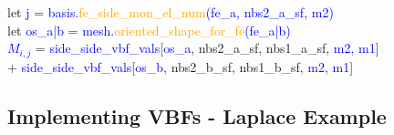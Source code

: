 \documentclass[compress]{beamer}
\begin{document}
\begin{frame}
{    \hspace{0.3cm}let \textcolor{blue}{j} = 
      \textcolor{blue}{basis.\textcolor{orange}{fe\_side\_mon\_el\_num}(\textcolor{green!50!black}{\small fe\_a, nbs2\_a\_sf}, {\small m2})}\\
    \hspace{0.3cm}let \textcolor{blue}{os\_a|b} = 
      \textcolor{blue}{mesh.\textcolor{orange}{oriented\_shape\_for\_fe}(\textcolor{green!50!black}{fe\_a|b})}\\
    \hspace{0.3cm}\textcolor{blue}{$M_{i,j}$} = 
      {\small \textcolor{blue}{side\_side\_vbf\_vals}[\textcolor{blue}{os\_a}, \textcolor{green!50!black}{nbs2\_a\_sf, nbs1\_a\_sf},
      \textcolor{blue}{m2, m1}]}\\
    \hspace{1.134cm}+
      {\small \textcolor{blue}{side\_side\_vbf\_vals}[\textcolor{blue}{os\_b}, \textcolor{green!50!black}{nbs2\_b\_sf, nbs1\_b\_sf},
      \textcolor{blue}{m2, m1}]}
  } 
\end{frame}


\subsection{Implementing VBFs - Laplace Example}
\end{document}
